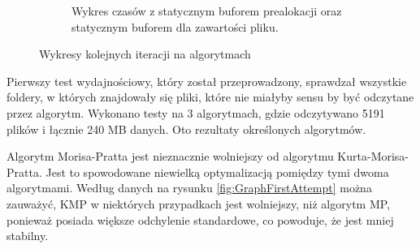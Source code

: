 \begin{figure}
\begin{subfigure}{0.8\textwidth}
    \caption{Wykres czasów z statycznym buforem prealokacji oraz statycznym buforem
    dla zawartości pliku.}
    \label{fig:GraphStaticPreallocAndFileBuffer}
\end{subfigure}
\caption{Wykresy kolejnych iteracji na algorytmach}
\label{fig:GraphsIterationComparison}
\end{figure}

Pierwszy test wydajnościowy, który został przeprowadzony, sprawdzał wszystkie 
foldery, w których znajdowały się pliki, które nie miałyby sensu by być odczytane
przez algorytm. Wykonano testy na 3 algorytmach, gdzie odczytywano 5191 plików 
i łącznie 240 MB danych. Oto rezultaty określonych algorytmów.

Algorytm Morisa-Pratta jest nieznacznie wolniejszy od algorytmu 
Kurta-Morisa-Pratta. Jest to spowodowane niewielką optymalizacją pomiędzy tymi 
dwoma algorytmami. Według danych na rysunku \ref{fig:GraphFirstAttempt} można 
zauważyć, KMP w niektórych przypadkach jest wolniejszy, niż algorytm MP, 
ponieważ posiada większe odchylenie standardowe, co powoduje, że jest mniej
stabilny. 

